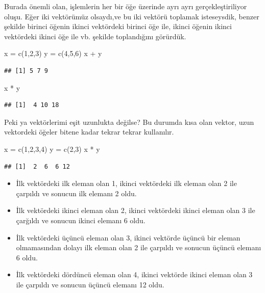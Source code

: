 \documentclass[
]{book}
\newenvironment{Shaded}{\begin{snugshade}}{\end{snugshade}}
\newcommand{\DecValTok}[1]{\textcolor[rgb]{0.00,0.00,0.81}{#1}}
\newcommand{\FunctionTok}[1]{\textcolor[rgb]{0.00,0.00,0.00}{#1}}
\newcommand{\NormalTok}[1]{#1}
\newcommand{\OtherTok}[1]{\textcolor[rgb]{0.56,0.35,0.01}{#1}}
\newcommand{\SpecialCharTok}[1]{\textcolor[rgb]{0.00,0.00,0.00}{#1}}
\providecommand{\tightlist}{%
  \setlength{\itemsep}{0pt}\setlength{\parskip}{0pt}}
\begin{document}
Burada önemli olan, işlemlerin her bir öğe üzerinde ayrı ayrı gerçekleştiriliyor oluşu. Eğer iki vektörümüz olsaydı,ve bu iki vektörü toplamak isteseysdik, benzer şekilde birinci öğenin ikinci vektördeki birinci öğe ile, ikinci öğenin ikinci vektördeki ikinci öğe ile vb. şekilde toplandığını görürdük.

\begin{Shaded}
\begin{Highlighting}[]
\NormalTok{x }\OtherTok{=} \FunctionTok{c}\NormalTok{(}\DecValTok{1}\NormalTok{,}\DecValTok{2}\NormalTok{,}\DecValTok{3}\NormalTok{)}
\NormalTok{y }\OtherTok{=} \FunctionTok{c}\NormalTok{(}\DecValTok{4}\NormalTok{,}\DecValTok{5}\NormalTok{,}\DecValTok{6}\NormalTok{)}
\NormalTok{x }\SpecialCharTok{+}\NormalTok{ y}
\end{Highlighting}
\end{Shaded}

\begin{verbatim}
## [1] 5 7 9
\end{verbatim}

\begin{Shaded}
\begin{Highlighting}[]
\NormalTok{x }\SpecialCharTok{*}\NormalTok{ y}
\end{Highlighting}
\end{Shaded}

\begin{verbatim}
## [1]  4 10 18
\end{verbatim}

Peki ya vektörlerimi eşit uzunlukta değilse? Bu durumda kısa olan vektor, uzun vektordeki öğeler bitene kadar tekrar tekrar kullanılır.

\begin{Shaded}
\begin{Highlighting}[]
\NormalTok{x }\OtherTok{=} \FunctionTok{c}\NormalTok{(}\DecValTok{1}\NormalTok{,}\DecValTok{2}\NormalTok{,}\DecValTok{3}\NormalTok{,}\DecValTok{4}\NormalTok{)}
\NormalTok{y }\OtherTok{=} \FunctionTok{c}\NormalTok{(}\DecValTok{2}\NormalTok{,}\DecValTok{3}\NormalTok{)}
\NormalTok{x }\SpecialCharTok{*}\NormalTok{ y}
\end{Highlighting}
\end{Shaded}

\begin{verbatim}
## [1]  2  6  6 12
\end{verbatim}

\begin{itemize}
\tightlist
\item
  İlk vektördeki ilk eleman olan 1, ikinci vektördeki ilk eleman olan 2 ile çarpıldı ve sonucun ilk elemanı 2 oldu.
\item
  İlk vektördeki ikinci eleman olan 2, ikinci vektördeki ikinci eleman olan 3 ile çarğıldı ve sonucun ikinci elemanı 6 oldu.
\item
  İlk vektördeki üçüncü eleman olan 3, ikinci vektörde üçüncü bir eleman olmamasından dolayı ilk eleman olan 2 ile çarpıldı ve sonucun üçüncü elemanı 6 oldu.
\item
  İlk vektördeki dördüncü eleman olan 4, ikinci vektörde ikinci eleman olan 3 ile çarpıldı ve sonucun üçüncü elemanı 12 oldu.
\end{itemize}
\end{document}
